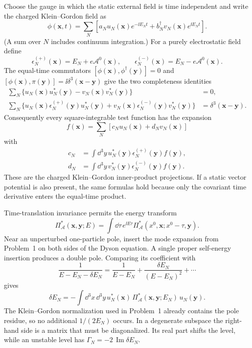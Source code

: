 \ExerciseEditorialNote

\begin{enumerate}
Choose the gauge in which the static external field is time independent and
write the charged Klein--Gordon field as
\[
 \phi(\mathbf x,t)=\sum_N\left[
 a_Nu_N(\mathbf x)e^{-\ii E_Nt}
 {}+b_N^\dagger v_N(\mathbf x)e^{\ii E_Nt}\right].
\]
(A sum over \(N\) includes continuum integration.)  For a purely
electrostatic field define
\[
 \epsilon_N^{(+)}(\mathbf x)=E_N+e\mathcal A^0(\mathbf x),\qquad
 \epsilon_N^{(-)}(\mathbf x)=E_N-e\mathcal A^0(\mathbf x).
\]
The equal-time commutators \([\phi(\mathbf x),\phi^\dagger(\mathbf y)]=0\)
and \([\phi(\mathbf x),\pi(\mathbf y)]=\ii\delta^3(\mathbf x-\mathbf y)\)
give the two completeness identities
\begin{align*}
 \sum_N\{u_N(\mathbf x)u_N^*(\mathbf y)
            -v_N(\mathbf x)v_N^*(\mathbf y)\}&=0,\\
 \sum_N\{u_N(\mathbf x)\epsilon_N^{(+)}(\mathbf y)u_N^*(\mathbf y)
            +v_N(\mathbf x)\epsilon_N^{(-)}(\mathbf y)v_N^*(\mathbf y)\}
 &=\delta^3(\mathbf x-\mathbf y).
\end{align*}
Consequently every square-integrable test function has the expansion
\[
 \boxed{f(\mathbf x)=\sum_N[c_Nu_N(\mathbf x)+d_Nv_N(\mathbf x)]}
\]
with
\[
 \boxed{\begin{aligned}
 c_N&=\int \dd^3y\,u_N^*(\mathbf y)
       \epsilon_N^{(+)}(\mathbf y)f(\mathbf y),\\
 d_N&=\int \dd^3y\,v_N^*(\mathbf y)
       \epsilon_N^{(-)}(\mathbf y)f(\mathbf y).
 \end{aligned}}
\]
These are the charged Klein--Gordon inner-product projections.  If a static
vector potential is also present, the same formulas hold because only the
covariant time derivative enters the equal-time product.

Time-translation invariance permits the energy transform
\[
 \Pi_{\mathcal A}^*(\mathbf x,\mathbf y;E)
 =\int \dd\tau\,e^{\ii E\tau}
   \Pi_{\mathcal A}^*(x^0,\mathbf x;x^0-\tau,\mathbf y).
\]
Near an unperturbed one-particle pole, insert the mode expansion from
Problem~1 on both sides of the Dyson equation.  A single proper self-energy
insertion produces a double pole.  Comparing its coefficient with
\[
 \frac1{E-E_N-\delta E_N}
 =\frac1{E-E_N}+\frac{\delta E_N}{(E-E_N)^2}+\cdots
\]
gives
\[
 \boxed{\displaystyle
 \delta E_N=-\int \dd^3x\,\dd^3y\,
 u_N^*(\mathbf x)\,
 \Pi_{\mathcal A}^*(\mathbf x,\mathbf y;E_N)\,
 u_N(\mathbf y) .}
\]
The Klein--Gordon normalization used in Problem~1 already contains the pole
residue, so no additional \(1/(2E_N)\) occurs.  In a degenerate subspace the
right-hand side is a matrix that must be diagonalized.  Its real part shifts
the level, while an unstable level has
\(\Gamma_N=-2\,\operatorname{Im}\delta E_N\).


\end{enumerate}
